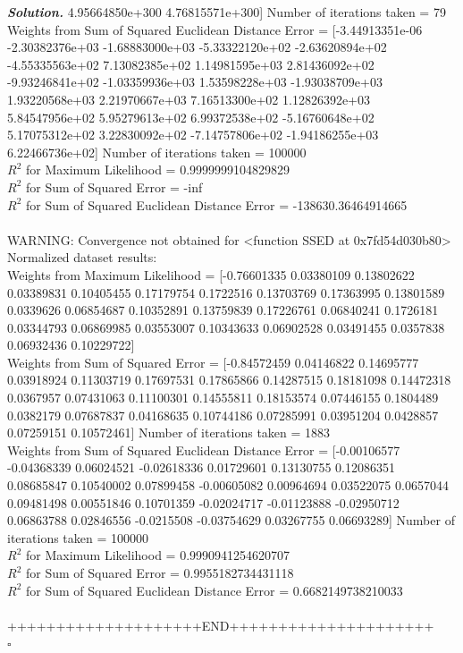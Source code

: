 \documentclass[8pt]{article}
\newenvironment{solution}[1][\it{Solution}]{\textbf{#1. } }{$\square$}
\begin{document}
\begin{solution}
 4.95664850e+300 4.76815571e+300] Number of iterations taken =  79 \\
Weights from Sum of Squared Euclidean Distance Error = [-3.44913351e-06 -2.30382376e+03 -1.68883000e+03 -5.33322120e+02
 -2.63620894e+02 -4.55335563e+02  7.13082385e+02  1.14981595e+03
  2.81436092e+02 -9.93246841e+02 -1.03359936e+03  1.53598228e+03
 -1.93038709e+03  1.93220568e+03  2.21970667e+03  7.16513300e+02
  1.12826392e+03  5.84547956e+02  5.95279613e+02  6.99372538e+02
 -5.16760648e+02  5.17075312e+02  3.22830092e+02 -7.14757806e+02
 -1.94186255e+03  6.22466736e+02] Number of iterations taken =  100000 \\
$R^2$ for Maximum Likelihood = 0.9999999104829829 \\
$R^2$ for Sum of Squared Error = -inf \\
$R^2$ for Sum of Squared Euclidean Distance Error = -138630.36464914665 \\
\\
WARNING: Convergence not obtained for <function SSED at 0x7fd54d030b80>\\
Normalized dataset results:\\
Weights from Maximum Likelihood = [-0.76601335  0.03380109  0.13802622  0.03389831  0.10405455  0.17179754
  0.1722516   0.13703769  0.17363995  0.13801589  0.0339626   0.06854687
  0.10352891  0.13759839  0.17226761  0.06840241  0.1726181   0.03344793
  0.06869985  0.03553007  0.10343633  0.06902528  0.03491455  0.0357838
  0.06932436  0.10229722] \\
Weights from Sum of Squared Error = [-0.84572459  0.04146822  0.14695777  0.03918924  0.11303719  0.17697531
  0.17865866  0.14287515  0.18181098  0.14472318  0.0367957   0.07431063
  0.11100301  0.14555811  0.18153574  0.07446155  0.1804489   0.0382179
  0.07687837  0.04168635  0.10744186  0.07285991  0.03951204  0.0428857
  0.07259151  0.10572461] Number of iterations taken =  1883 \\
Weights from Sum of Squared Euclidean Distance Error = [-0.00106577 -0.04368339  0.06024521 -0.02618336  0.01729601  0.13130755
  0.12086351  0.08685847  0.10540002  0.07899458 -0.00605082  0.00964694
  0.03522075  0.0657044   0.09481498  0.00551846  0.10701359 -0.02024717
 -0.01123888 -0.02950712  0.06863788  0.02846556 -0.0215508  -0.03754629
  0.03267755  0.06693289] Number of iterations taken =  100000 \\
$R^2$ for Maximum Likelihood = 0.9990941254620707 \\
$R^2$ for Sum of Squared Error = 0.9955182734431118 \\
$R^2$ for Sum of Squared Euclidean Distance Error = 0.6682149738210033 \\
\\
++++++++++++++++++++END+++++++++++++++++++++\\


\end{solution}
\end{document}
